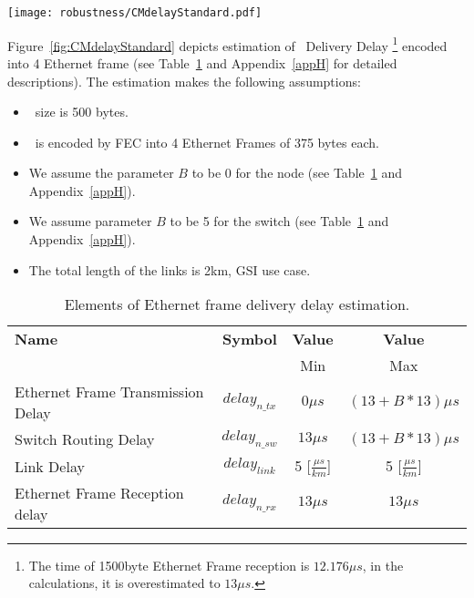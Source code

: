 \begin{center}
	\texttt{[image: robustness/CMdelayStandard.pdf]}
	\label{fig:CMdelayStandard}
\end{center}

Figure~\ref{fig:CMdelayStandard} depicts estimation of \ControlMessage\ Delivery
Delay \footnote{The time of 1500byte Ethernet Frame reception is $12.176\mu s$,
in the calculations, it is overestimated to $13\mu s$.}   encoded into 4
Ethernet frame (see Table~\ref{tab:EtherFrameDelayGeneral} and 
Appendix~\ref{appH} for detailed descriptions). The estimation makes the
following assumptions:
\begin{itemize}
  \item \ControlMessage\ size is 500 bytes.
  \item \ControlMessage\ is encoded by FEC into 4 Ethernet Frames of 375 bytes
each.
  \item We assume the parameter $B$ to be 0 for the node (see
Table~\ref{tab:EtherFrameDelayGeneral} and Appendix~\ref{appH}).
  \item We assume parameter $B$ to be 5 for the switch (see
Table~\ref{tab:EtherFrameDelayGeneral} and Appendix~\ref{appH}).
  \item The total length of the links is 2km, GSI use case.
\end{itemize}

\begin{table}[ht]
\caption{Elements of Ethernet frame delivery delay estimation.} 
\centering
	\begin{tabular}{| l |  c | c | c |}          \hline
\textbf{Name}&\textbf{Symbol}&\textbf{Value}&\textbf{Value}                  \\
                                 &                &  Min& Max          \\ \hline
Ethernet Frame Transmission Delay&$delay_{n\_tx}$&$0\mu s$&$(13 + B * 13)\mu s$
\\ \hline
Switch Routing Delay &$delay_{n\_sw}$&$13\mu s$ &$(13 + B * 13)\mu s$ 
 
\\ \hline
Link Delay                       & $delay_{link}$ &5 [$\frac{\mu
s}{km}$]&5 [$\frac{\mu s}{km}$]      
\\ \hline
Ethernet Frame Reception delay   & $delay_{n\_rx}$&$13\mu s$&$13\mu s$

\\ \hline
\end{tabular}
\label{tab:EtherFrameDelayGeneral}
\end{table}


